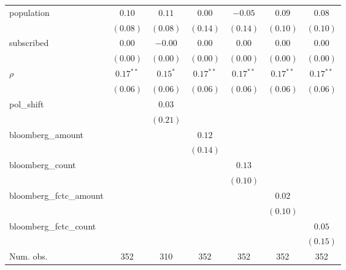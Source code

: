 \begin{table}[!h]
\begin{center}
\begin{tabular}{l c c c c c c }
population              & $0.10$       & $0.11$       & $0.00$       & $-0.05$      & $0.09$       & $0.08$       \\
                        & $(0.08)$     & $(0.08)$     & $(0.14)$     & $(0.14)$     & $(0.10)$     & $(0.10)$     \\
subscribed              & $0.00$       & $-0.00$      & $0.00$       & $0.00$       & $0.00$       & $0.00$       \\
                        & $(0.00)$     & $(0.00)$     & $(0.00)$     & $(0.00)$     & $(0.00)$     & $(0.00)$     \\
$\rho$                  & $0.17^{**}$  & $0.15^{*}$   & $0.17^{**}$  & $0.17^{**}$  & $0.17^{**}$  & $0.17^{**}$  \\
                        & $(0.06)$     & $(0.06)$     & $(0.06)$     & $(0.06)$     & $(0.06)$     & $(0.06)$     \\
pol\_shift              &              & $0.03$       &              &              &              &              \\
                        &              & $(0.21)$     &              &              &              &              \\
bloomberg\_amount       &              &              & $0.12$       &              &              &              \\
                        &              &              & $(0.14)$     &              &              &              \\
bloomberg\_count        &              &              &              & $0.13$       &              &              \\
                        &              &              &              & $(0.10)$     &              &              \\
bloomberg\_fctc\_amount &              &              &              &              & $0.02$       &              \\
                        &              &              &              &              & $(0.10)$     &              \\
bloomberg\_fctc\_count  &              &              &              &              &              & $0.05$       \\
                        &              &              &              &              &              & $(0.15)$     \\
\midrule
Num. obs.               & 352          & 310          & 352          & 352          & 352          & 352          \\

\end{tabular}
\end{center}
\end{table}
